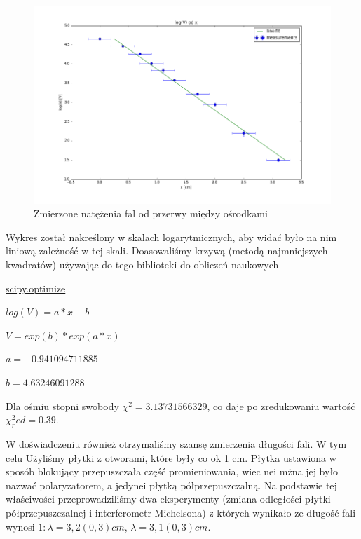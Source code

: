 \documentclass[a4paper,12pt]{article}
\begin{document}
\begin{figure} [H]
  \begin{center}
    \includegraphics[width = 15cm]{logV.png}
    \caption{Zmierzone natężenia fal od przerwy między ośrodkami}
  \end{center}
\end{figure}

Wykres został nakreślony w skalach logarytmicznych, aby widać było na nim liniową zależność w tej skali. 
Doasowaliśmy krzywą (metodą najmniejszych kwadratów) używając do tego biblioteki do obliczeń naukowych

\href{'http://docs.scipy.org/doc/scipy/reference/tutorial/optimize.html'}{scipy.optimize}


$log (V) = a * x + b$

$V = exp(b)*exp(a*x)$	

$a = -0.941094711885$

$ b = 4.63246091288$




Dla ośmiu stopni swobody $\chi^2 = 3.13731566329$, co daje po zredukowaniu wartość $\chi^2_red=0.39$. 


W doświadczeniu również otrzymaliśmy szansę zmierzenia długości fali. W tym celu Użyliśmy płytki z otworami, które były co ok 1 cm. Płytka ustawiona w sposób blokujący przepuszczała część promieniowania, wiec nei mżna jej było nazwać polaryzatorem, a jedynei płytką półprzepuszczalną. Na podstawie tej właściwości przeprowadziliśmy dwa eksperymenty (zmiana odległości płytki półprzepuszczalnej i interferometr Michelsona) z których wynikało ze długość fali wynosi $ 1: \lambda= 3,2 (0,3) cm  $, $ \lambda= 3,1 (0,3) cm $.
\end{document}
